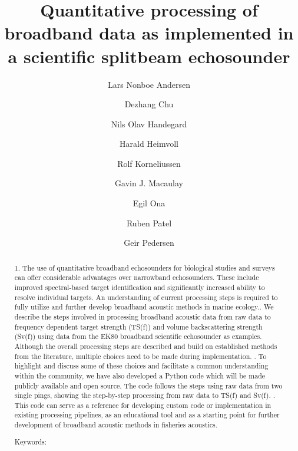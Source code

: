 \documentclass[preprint,12pt,TurnOnLineNumbers]{JASAnew}
\begin{document}
\title[]{Quantitative processing of broadband data as implemented in a scientific splitbeam echosounder}

\author{Lars Nonboe Andersen}

\author{Dezhang Chu}

\author{Nils Olav Handegard}

\author{Harald Heimvoll}

\author{Rolf Korneliussen}
\author{Gavin J. Macaulay}
\author{Egil Ona}

\author{Ruben Patel}

\author{Geir Pedersen}

\begin{abstract}
1. The use of quantitative broadband echosounders for biological studies and surveys can offer considerable advantages over narrowband echosounders. These include improved spectral-based target identification and significantly increased ability to resolve individual targets. An understanding of current processing steps is required to fully utilize and further develop broadband acoustic methods in marine ecology.. We describe the steps involved in processing broadband acoustic data from raw data to frequency dependent target strength (TS(f)) and volume backscattering strength (Sv(f)) using data from the EK80 broadband scientific echosounder as examples. Although the overall processing steps are described and build on established methods from the literature, multiple choices need to be made during implementation. . To highlight and discuss some of these choices and facilitate a common understanding within the community, we have also developed a Python code which will be made publicly available and open source. The code follows the steps using raw data from two single pings, showing the step-by-step processing from raw data to TS(f) and Sv(f). . This code can serve as a reference for developing custom code or implementation in existing processing pipelines, as an educational tool and as a starting point for further development of broadband acoustic methods in fisheries acoustics.\linebreak

Keywords:  \linebreak

\end{abstract}
\end{document}
